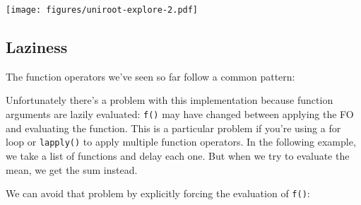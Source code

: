 \texttt{[image: figures/uniroot-explore-2.pdf]}

\subsection{Laziness}

The function operators we've seen so far follow a common pattern:

\begin{Shaded}
\begin{Highlighting}[]
\StringTok{ }
    \StringTok{ }
  \NormalTok{\}}
\NormalTok{\}}
\end{Highlighting}
\end{Shaded}

Unfortunately there's a problem with this implementation because
function arguments are lazily evaluated: \texttt{f()} may have changed
between applying the FO and evaluating the function. This is a
particular problem if you're using a for loop or \texttt{lapply()} to
apply multiple function operators. In the following example, we take a
list of functions and delay each one. But when we try to evaluate the
mean, we get the sum instead. 

\begin{Shaded}
\begin{Highlighting}[]
\StringTok{ }\NormalTok{(}  
\StringTok{ } \NormalTok{)}

\NormalTok{(}\NormalTok{:}\NormalTok{)}
\end{Highlighting}
\end{Shaded}

We can avoid that problem by explicitly forcing the evaluation of
\texttt{f()}:

\begin{Shaded}
\begin{Highlighting}[]
\StringTok{ }
  \NormalTok{\}}
\NormalTok{\}}

\StringTok{ } \NormalTok{)}
\NormalTok{(}\NormalTok{:}\NormalTok{)}
\end{Highlighting}
\end{Shaded}

